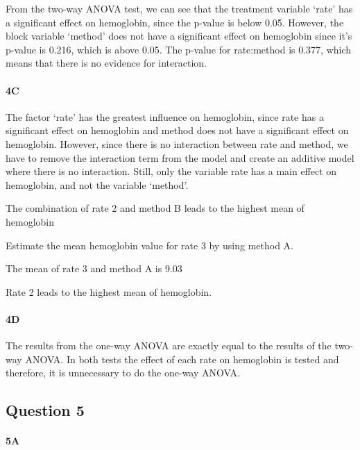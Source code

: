 \documentclass[
]{article}
\begin{document}
From the two-way ANOVA test, we can see that the treatment variable
`rate' has a significant effect on hemoglobin, since the p-value is
below 0.05. However, the block variable `method' does not have a
significant effect on hemoglobin since it's p-value is 0.216, which is
above 0.05. The p-value for rate:method is 0.377, which means that there
is no evidence for interaction.

\hypertarget{c-3}{%
\paragraph{\texorpdfstring{\textbf{4C}}{4C}}\label{c-3}}

The factor `rate' has the greatest influence on hemoglobin, since rate
has a significant effect on hemoglobin and method does not have a
significant effect on hemoglobin. However, since there is no interaction
between rate and method, we have to remove the interaction term from the
model and create an additive model where there is no interaction. Still,
only the variable rate has a main effect on hemoglobin, and not the
variable `method'.

The combination of rate 2 and method B leads to the highest mean of
hemoglobin

Estimate the mean hemoglobin value for rate 3 by using method A.

The mean of rate 3 and method A is 9.03

Rate 2 leads to the highest mean of hemoglobin.

\hypertarget{d-3}{%
\paragraph{\texorpdfstring{\textbf{4D}}{4D}}\label{d-3}}

The results from the one-way ANOVA are exactly equal to the results of
the two-way ANOVA. In both tests the effect of each rate on hemoglobin
is tested and therefore, it is unnecessary to do the one-way ANOVA.

\hypertarget{question-5}{%
\subsection{Question 5}\label{question-5}}

\hypertarget{a-4}{%
\paragraph{\texorpdfstring{\textbf{5A}}{5A}}\label{a-4}}
\end{document}
